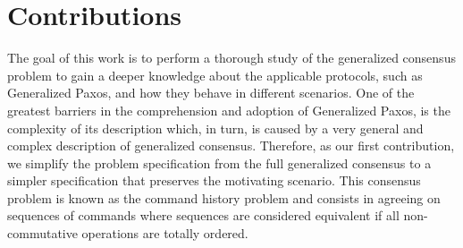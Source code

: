 \section{Contributions}
The goal of this work is to perform a thorough study of the generalized consensus problem to gain a deeper knowledge about the applicable protocols, such as Generalized Paxos, and how they behave in different scenarios. One of the greatest barriers in the comprehension and adoption of Generalized Paxos, is the complexity of its description which, in turn, is caused by a very general and complex description of generalized consensus. Therefore, as our first contribution, we simplify the problem specification from the full generalized consensus to a simpler specification that preserves the motivating scenario. This consensus problem is known as the command history problem and consists in agreeing on sequences of commands where sequences are considered equivalent if all non-commutative operations are totally ordered. \par
